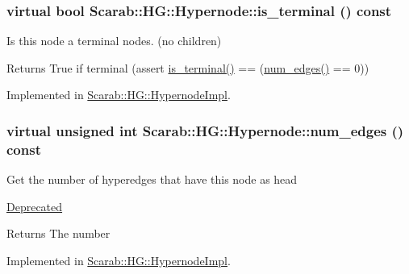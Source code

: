 \hypertarget{class_scarab_1_1_h_g_1_1_hypernode_ae3e1107309a8817d1015bd70a90c1c49}{
\subsubsection[{is\_\-terminal}]{\setlength{\rightskip}{0pt plus 5cm}virtual bool Scarab::HG::Hypernode::is\_\-terminal () const}}
\label{class_scarab_1_1_h_g_1_1_hypernode_ae3e1107309a8817d1015bd70a90c1c49}
Is this node a terminal nodes. (no children)

\begin{DoxyReturn}{Returns}
True if terminal (assert \hyperlink{class_scarab_1_1_h_g_1_1_hypernode_ae3e1107309a8817d1015bd70a90c1c49}{is\_\-terminal()} == (\hyperlink{class_scarab_1_1_h_g_1_1_hypernode_add2f4d556be223b906bfbab9f1b60870}{num\_\-edges()} == 0)) 
\end{DoxyReturn}


Implemented in \hyperlink{class_scarab_1_1_h_g_1_1_hypernode_impl_a2bb4b33ff207c3c1babe135b9af6323e}{Scarab::HG::HypernodeImpl}.

\hypertarget{class_scarab_1_1_h_g_1_1_hypernode_add2f4d556be223b906bfbab9f1b60870}{
\subsubsection[{num\_\-edges}]{\setlength{\rightskip}{0pt plus 5cm}virtual unsigned int Scarab::HG::Hypernode::num\_\-edges () const}}
\label{class_scarab_1_1_h_g_1_1_hypernode_add2f4d556be223b906bfbab9f1b60870}
Get the number of hyperedges that have this node as head \begin{Desc}
\item[\hyperlink{deprecated__deprecated000007}{Deprecated}]\end{Desc}
\begin{DoxyReturn}{Returns}
The number 
\end{DoxyReturn}


Implemented in \hyperlink{class_scarab_1_1_h_g_1_1_hypernode_impl_a7fed4809706319cc916ed4c04a641436}{Scarab::HG::HypernodeImpl}.

